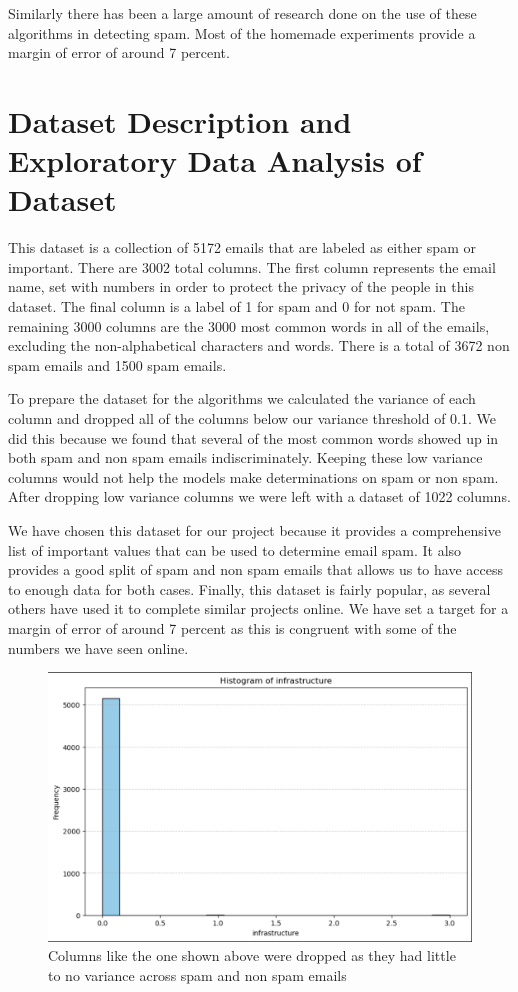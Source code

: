 \documentclass[conference]{IEEEtran}
\begin{document}
Similarly there has been a large amount of research done on the use of these algorithms in detecting spam. Most of the homemade experiments provide a margin of error of around 7 percent. 

\section{\textbf{Dataset Description and Exploratory Data Analysis of Dataset}}

This dataset is a collection of 5172 emails that are labeled as either spam or important. There are 3002 total columns. The first column represents the email name, set with numbers in order to protect the privacy of the people in this dataset. The final column is a label of 1 for spam and 0 for not spam. The remaining 3000 columns are the 3000 most common words in all of the emails, excluding the non-alphabetical characters and words. There is a total of 3672 non spam emails and 1500 spam emails. 

To prepare the dataset for the algorithms we calculated the variance of each column and dropped all of the columns below our variance threshold of 0.1. We did this because we found that several of the most common words showed up in both spam and non spam emails indiscriminately. Keeping these low variance columns would not help the models make determinations on spam or non spam. After dropping low variance columns we were left with a dataset of 1022 columns. 

We have chosen this dataset for our project because it provides a comprehensive list of important values that can be used to determine email spam. It also provides a good split of spam and non spam emails that allows us to have access to enough data for both cases. Finally, this dataset is fairly popular, as several others have used it to complete similar projects online. We have set a target for a margin of error of around 7 percent as this is congruent with some of the numbers we have seen online.  

\begin{figure}
    \centering
    \includegraphics[width=0.7\linewidth]{Screenshot 2023-12-08 at 12.44.39.png}
    \caption{Columns like the one shown above were dropped as they had little to no variance across spam and non spam emails}
    \label{fig:enter-label}
\end{figure}
\end{document}
